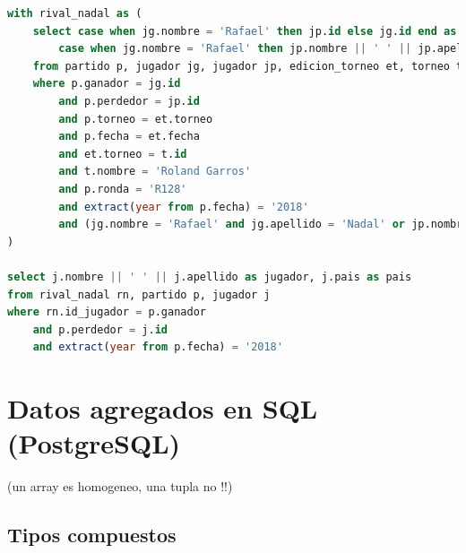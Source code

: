 \documentclass[10pt]{opticajnl}
\begin{document}
\begin{lstlisting}[language=SQL]
with rival_nadal as (
	select case when jg.nombre = 'Rafael' then jp.id else jg.id end as id_jugador, 
		case when jg.nombre = 'Rafael' then jp.nombre || ' ' || jp.apellido else jg.nombre || ' ' || jg.apellido end as jugador
	from partido p, jugador jg, jugador jp, edicion_torneo et, torneo t 
	where p.ganador = jg.id 
		and p.perdedor = jp.id
		and p.torneo = et.torneo 
		and p.fecha = et.fecha
		and et.torneo = t.id 
		and t.nombre = 'Roland Garros'
		and p.ronda = 'R128'
		and extract(year from p.fecha) = '2018'
		and (jg.nombre = 'Rafael' and jg.apellido = 'Nadal' or jp.nombre = 'Rafael' and jp.apellido = 'Nadal') 
)

select j.nombre || ' ' || j.apellido as jugador, j.pais as pais
from rival_nadal rn, partido p, jugador j
where rn.id_jugador = p.ganador 
	and p.perdedor = j.id
	and extract(year from p.fecha) = '2018'
\end{lstlisting}


































\section{Datos agregados en SQL (PostgreSQL)}
(un array es homogeneo, una tupla no !!)

\subsection{Tipos compuestos}
\end{document}
